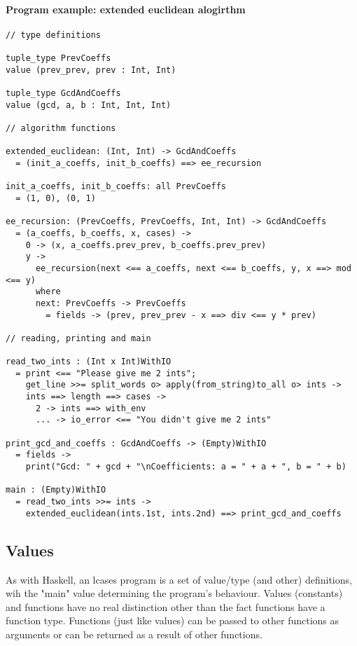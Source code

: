 \documentclass{article}
\begin{document}
\paragraph{Program example: extended euclidean alogirthm}
\begin{verbatim}
// type definitions

tuple_type PrevCoeffs
value (prev_prev, prev : Int, Int)

tuple_type GcdAndCoeffs
value (gcd, a, b : Int, Int, Int)

// algorithm functions

extended_euclidean: (Int, Int) -> GcdAndCoeffs
  = (init_a_coeffs, init_b_coeffs) ==> ee_recursion

init_a_coeffs, init_b_coeffs: all PrevCoeffs
  = (1, 0), (0, 1)

ee_recursion: (PrevCoeffs, PrevCoeffs, Int, Int) -> GcdAndCoeffs
  = (a_coeffs, b_coeffs, x, cases) ->
    0 -> (x, a_coeffs.prev_prev, b_coeffs.prev_prev)
    y ->
      ee_recursion(next <== a_coeffs, next <== b_coeffs, y, x ==> mod <== y)
      where
      next: PrevCoeffs -> PrevCoeffs
        = fields -> (prev, prev_prev - x ==> div <== y * prev)

// reading, printing and main

read_two_ints : (Int x Int)WithIO
  = print <== "Please give me 2 ints";
    get_line >>= split_words o> apply(from_string)to_all o> ints ->
    ints ==> length ==> cases ->
      2 -> ints ==> with_env
      ... -> io_error <== "You didn't give me 2 ints"
 
print_gcd_and_coeffs : GcdAndCoeffs -> (Empty)WithIO
  = fields ->
    print("Gcd: " + gcd + "\nCoefficients: a = " + a + ", b = " + b)

main : (Empty)WithIO
  = read_two_ints >>= ints ->
    extended_euclidean(ints.1st, ints.2nd) ==> print_gcd_and_coeffs
\end{verbatim}

\subsection{Values}

As with Haskell, an lcases program is a set of value/type (and other) definitions,
wih the "main" value determining the program's behaviour. Values (constants) and
functions have no real distinction other than the fact functions have a function
type. Functions (just like values) can be passed to other functions as 
arguments or can be returned as a result of other functions.
\end{document}
